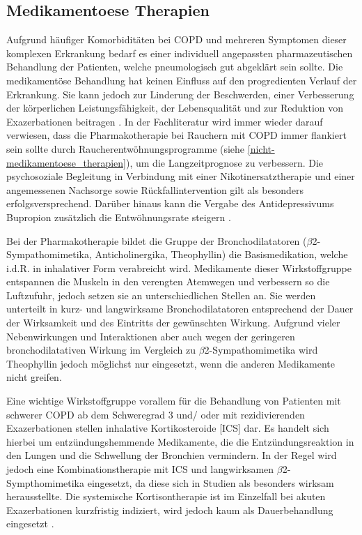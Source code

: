 \subsection{Medikamentoese Therapien}
\label{medikamentoese_therapien}
Aufgrund häufiger Komorbiditäten bei COPD und mehreren Symptomen dieser komplexen Erkrankung bedarf es einer individuell angepassten pharmazeutischen Behandlung der Patienten, welche pneumologisch gut abgeklärt sein sollte. Die medikamentöse Behandlung hat keinen Einfluss auf den progredienten Verlauf der Erkrankung. Sie kann jedoch zur Linderung der Beschwerden, einer Verbesserung der körperlichen Leistungsfähigkeit, der Lebensqualität und zur Reduktion von Exazerbationen beitragen \autocite[vgl.][249]{gillissen2007}. In der Fachliteratur wird immer wieder darauf verwiesen, dass die Pharmakotherapie bei Rauchern mit COPD immer flankiert sein sollte durch Raucherentwöhnungsprogramme (siehe \ref{nicht-medikamentoese_therapien}), um die Langzeitprognose zu verbessern. Die psychosoziale Begleitung in Verbindung mit einer Nikotinersatztherapie und einer angemessenen Nachsorge sowie Rückfallintervention gilt als besonders erfolgsversprechend. Darüber hinaus kann die Vergabe des Antidepressivums Bupropion zusätzlich die Entwöhnungsrate steigern \autocite[vgl.][e12]{vogelmeier2007}.

Bei der Pharmakotherapie bildet die Gruppe der Bronchodilatatoren ($\beta$2- Sympathomimetika, Anticholinergika, Theophyllin) die Basismedikation, welche i.d.R. in inhalativer Form verabreicht wird.
Medikamente dieser Wirkstoffgruppe entspannen die Muskeln in den verengten Atemwegen und verbessern so die Luftzufuhr, jedoch setzen sie an unterschiedlichen Stellen an.
Sie werden unterteilt in kurz- und langwirksame Bronchodilatatoren entsprechend der Dauer der Wirksamkeit und des Eintritts der gewünschten Wirkung. Aufgrund vieler Nebenwirkungen und Interaktionen aber auch wegen der geringeren bronchodilatativen Wirkung im Vergleich zu $\beta$2-Sympathomimetika wird Theophyllin jedoch möglichst nur eingesetzt, wenn die anderen Medikamente nicht greifen. 

Eine wichtige Wirkstoffgruppe vorallem für die Behandlung von Patienten mit schwerer COPD ab dem Schweregrad 3 und/ oder mit rezidivierenden Exazerbationen stellen inhalative Kortikosteroide [ICS] dar. Es handelt sich hierbei um entzündungshemmende Medikamente, die die Entzündungsreaktion in den Lungen und die Schwellung der Bronchien vermindern. In der Regel wird jedoch eine Kombinationstherapie mit ICS und langwirksamen $\beta$2-Sympthomimetika eingesetzt, da diese sich in Studien als besonders wirksam herausstellte. Die systemische Kortisontherapie ist im Einzelfall bei akuten Exazerbationen kurzfristig indiziert, wird jedoch kaum als Dauerbehandlung eingesetzt \autocite[vgl.][249f., 253]{gillissen2007}. 

